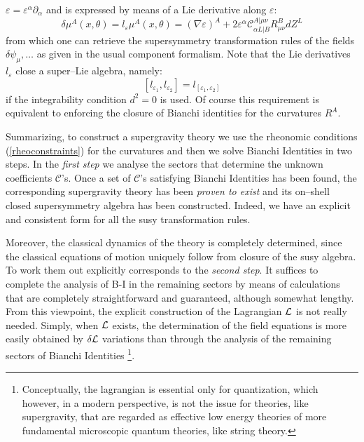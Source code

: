 \documentclass[a4paper,12pt]{article}
\begin{document}
$\varepsilon=\varepsilon^{\alpha}\partial_{\alpha}$ and is expressed
by means of a Lie derivative along $\varepsilon$:
\begin{equation}
\delta\mu^A(x,\theta)=l_{\varepsilon}\mu^A(x,\theta) = (\nabla\varepsilon)^A
+ 2 \varepsilon^{\alpha}\mathcal{C}^{A|\mu\nu}_{\alpha L|B}R^B_{\mu\nu}dZ^L
\label{lie}
\end{equation}
from which one can retrieve the  supersymmetry transformation rules of the
fields $\delta\psi_{\mu},\dots$ as given
in the usual component formalism. Note that the Lie derivatives $l_{\varepsilon}$
close a super--Lie algebra, namely:
\begin{equation}
\left[l_{\varepsilon_1},l_{\varepsilon_2}\right] = l_{[\varepsilon_1,\varepsilon_2]}
\end{equation}
if the integrability condition $d^2=0$ is used. Of course this requirement is
equivalent to enforcing the
closure of  Bianchi identities for the curvatures $R^A$.
\par
Summarizing, to construct a supergravity theory we use the rheonomic conditions
(\ref{rheoconstraints}) for the curvatures and then we solve Bianchi
Identities in two steps.
In the {\em first step} we analyse the sectors that determine the unknown
coefficients $\mathcal{C}$'s.
Once a set of $\mathcal{C}$'s satisfying Bianchi Identities has
been found, the corresponding supergravity theory has been {\em proven to
  exist} and its on--shell closed supersymmetry algebra has been constructed.
Indeed, we have an explicit and consistent form for all the susy transformation rules.
\par
Moreover, the classical dynamics of the theory is completely
determined, since the classical equations of motion uniquely follow from closure of the susy
algebra.
To work them out explicitly corresponds to the {\em second step}.
It suffices to complete the analysis of B-I in the remaining sectors
by means of calculations that are completely straightforward and guaranteed, although somewhat lengthy.
From this viewpoint, the explicit construction of the Lagrangian $\cal L$ is not really needed.
Simply, when $\cal L$ exists, the determination of the field equations is more
easily obtained by $\delta\cal L$ variations than through the analysis of
the remaining sectors of Bianchi Identities
\footnote{Conceptually, the lagrangian is essential only for quantization, which
however, in a modern perspective, is not the issue for theories, like
supergravity, that are regarded as effective low energy theories of more
fundamental microscopic quantum theories, like string theory.}.
\end{document}
